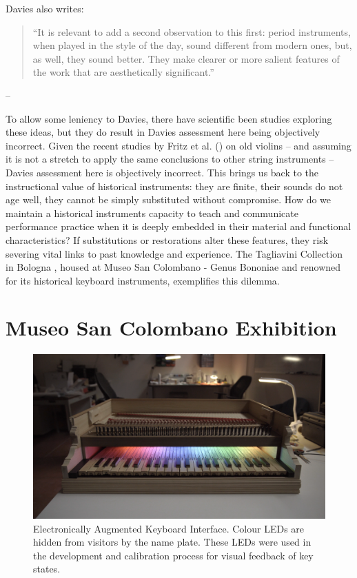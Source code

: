 Davies also writes:
\begin{quotation}
``It is relevant to add a second observation to this first: period instruments, when played in the style of the day, sound different from modern ones, but, as well, they sound better. They make clearer or more salient features of the work that are aesthetically significant.''
\end{quotation}
\begin{flushright}
-- \cite[p. 218]{davies_authenticity_2001}
\end{flushright}

To allow some leniency to Davies, there have scientific been studies exploring these ideas, but they do result in Davies assessment here being objectively incorrect.
Given the recent studies by Fritz et al. (\citeyear{fritz_player_2012, fritz_soloist_2014, fritz_listener_2017}) on old violins -- and assuming it is not a stretch to apply the same conclusions to other string instruments -- Davies assessment here is objectively incorrect.
This brings us back to the instructional value of historical instruments: they are finite, their sounds do not age well, they cannot be simply substituted without compromise. How do we maintain a historical instruments capacity to teach and communicate performance practice when it is deeply embedded in their material and functional characteristics? If substitutions or restorations alter these features, they risk severing vital links to past knowledge and experience. The Tagliavini Collection in Bologna \cite{tagliavini_clavicembali_1987}, housed at Museo San Colombano - Genus Bononiae and renowned for its historical keyboard instruments, exemplifies this dilemma.

\section{Museo San Colombano Exhibition}
\begin{figure}
    \centering
    \includegraphics[width=1\linewidth]{img/mark2.png}
    \caption{Electronically Augmented Keyboard Interface. Colour LEDs are hidden from visitors by the name plate. These LEDs were used in the development and calibration process for visual feedback of key states.}
    \label{fig:mark2}
\end{figure}

